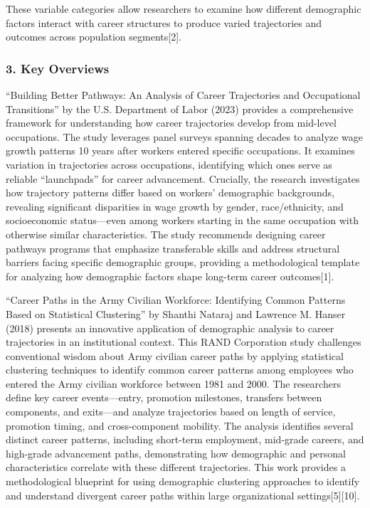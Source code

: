 \documentclass[./main.tex]{subfiles}
\begin{document}
These variable categories allow researchers to examine how different
demographic factors interact with career structures to produce varied
trajectories and outcomes across population segments{[}2{]}.

\subsubsection{3. Key Overviews}\label{key-overviews}

``Building Better Pathways: An Analysis of Career Trajectories and
Occupational Transitions'' by the U.S. Department of Labor (2023)
provides a comprehensive framework for understanding how career
trajectories develop from mid-level occupations. The study leverages
panel surveys spanning decades to analyze wage growth patterns 10 years
after workers entered specific occupations. It examines variation in
trajectories across occupations, identifying which ones serve as
reliable ``launchpads'' for career advancement. Crucially, the research
investigates how trajectory patterns differ based on workers'
demographic backgrounds, revealing significant disparities in wage
growth by gender, race/ethnicity, and socioeconomic status---even among
workers starting in the same occupation with otherwise similar
characteristics. The study recommends designing career pathways programs
that emphasize transferable skills and address structural barriers
facing specific demographic groups, providing a methodological template
for analyzing how demographic factors shape long-term career
outcomes{[}1{]}.

``Career Paths in the Army Civilian Workforce: Identifying Common
Patterns Based on Statistical Clustering'' by Shanthi Nataraj and
Lawrence M. Hanser (2018) presents an innovative application of
demographic analysis to career trajectories in an institutional context.
This RAND Corporation study challenges conventional wisdom about Army
civilian career paths by applying statistical clustering techniques to
identify common career patterns among employees who entered the Army
civilian workforce between 1981 and 2000. The researchers define key
career events---entry, promotion milestones, transfers between
components, and exits---and analyze trajectories based on length of
service, promotion timing, and cross-component mobility. The analysis
identifies several distinct career patterns, including short-term
employment, mid-grade careers, and high-grade advancement paths,
demonstrating how demographic and personal characteristics correlate
with these different trajectories. This work provides a methodological
blueprint for using demographic clustering approaches to identify and
understand divergent career paths within large organizational
settings{[}5{]}{[}10{]}.
\end{document}
